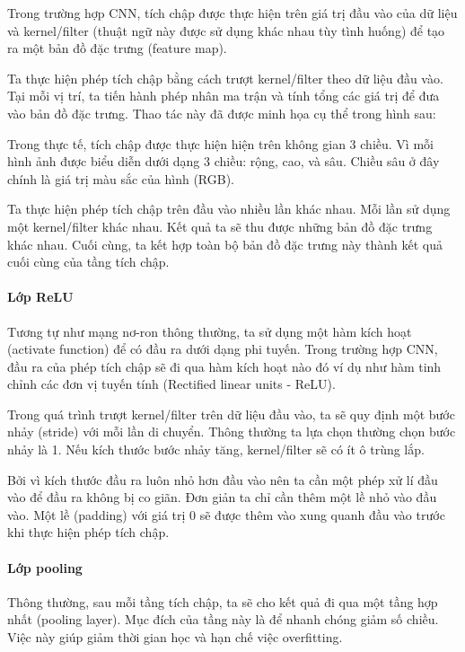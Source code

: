 Trong trường hợp CNN, tích chập được thực hiện trên giá trị đầu vào của dữ liệu và kernel/filter (thuật ngữ này được sử dụng khác nhau tùy tình huống) để tạo ra một bản đồ đặc trưng (feature map). 

Ta thực hiện phép tích chập bằng cách trượt kernel/filter theo dữ liệu đầu vào. Tại mỗi vị trí, ta tiến hành phép nhân ma trận và tính tổng các giá trị để đưa vào bản đồ đặc trưng. Thao tác này đã được minh họa cụ thể trong hình sau:


Trong thực tế, tích chập được thực hiện hiện trên không gian 3 chiều. Vì mỗi hình ảnh được biểu diễn dưới dạng 3 chiều: rộng, cao, và sâu. Chiều sâu ở đây chính là giá trị màu sắc của hình (RGB).

Ta thực hiện phép tích chập trên đầu vào nhiều lần khác nhau. Mỗi lần sử dụng một kernel/filter khác nhau. Kết quả ta sẽ thu được những bản đồ đặc trưng khác nhau. Cuối cùng, ta kết hợp toàn bộ bản đồ đặc trưng này thành kết quả cuối cùng của tầng tích chập.

\paragraph{Lớp ReLU}
Tương tự như mạng nơ-ron thông thường, ta sử dụng một hàm kích hoạt (activate function) để có đầu ra dưới dạng phi tuyến. Trong trường hợp CNN, đầu ra của phép tích chập sẽ đi qua hàm kích hoạt nào đó ví dụ như hàm tinh chỉnh các đơn vị tuyến tính (Rectified linear units - ReLU). 

Trong quá trình trượt kernel/filter trên dữ liệu đầu vào, ta sẽ quy định một bước nhảy (stride) với mỗi lần di chuyển. Thông thường ta lựa chọn thường chọn bước nhảy là 1. Nếu kích thước bước nhảy tăng, kernel/filter sẽ có ít ô trùng lắp.

Bởi vì kích thước đầu ra luôn nhỏ hơn đầu vào nên ta cần một phép xử lí đầu vào để đầu ra không bị co giãn. Đơn giản ta chỉ cần thêm một lề nhỏ vào đầu vào. Một lề (padding) với giá trị 0 sẽ được thêm vào xung quanh đầu vào trước khi thực hiện phép tích chập. 

\paragraph{Lớp pooling}
Thông thường, sau mỗi tầng tích chập, ta sẽ cho kết quả đi qua một tầng hợp nhất (pooling layer). Mục đích của tầng này là để nhanh chóng giảm số chiều. Việc này giúp giảm thời gian học và hạn chế việc overfitting. 

